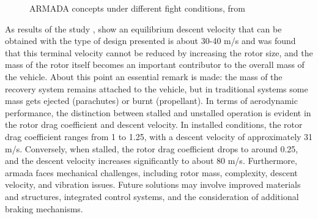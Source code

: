 \begin{figure}[!htb]
    \centering
    \hfill
    \caption{ARMADA concepts under different fight conditions, from \cite{noauthor_armada_nodate}}
    \label{fig:armada_windtunnel}
\end{figure}

As results of the study \cite{noauthor_armada_nodate}, show an equilibrium descent velocity that can be obtained with the type of design presented is about 30-40 \unit{m/s} and was found that this terminal velocity cannot be reduced by increasing the rotor size, and the mass of the rotor itself becomes an important contributor to the overall mass of the vehicle. About this point an essential remark is made:  the mass of the recovery system remains attached to the vehicle, but in traditional systems some mass gets ejected (parachutes) or burnt (propellant). In terms of aerodynamic performance, the distinction between stalled and unstalled operation is evident in the rotor drag coefficient and descent velocity. In installed conditions, the rotor drag coefficient ranges from 1 to 1.25, with a descent velocity of approximately 31 \unit{m/s}. Conversely, when stalled, the rotor drag coefficient drops to around 0.25, and the descent velocity increases significantly to about 80 \unit{m/s}. Furthermore, \gls{armada} faces mechanical challenges, including rotor mass, complexity, descent velocity, and vibration issues. Future solutions may involve improved materials and structures, integrated control systems, and the consideration of additional braking mechanisms.

